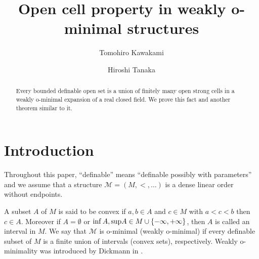 \documentclass{amsart}
\theoremstyle{definition}
\theoremstyle{plain}
\def \sup {{\rm sup}}
\begin{document}
\title[Open cell property in weakly o-minimal structures]{Open cell property in weakly o-minimal structures}
\author[T. Kawakami]{Tomohiro Kawakami}
\address{Department of Mathematics,
	Wakayama University,
	Wakayama, 640-8510, Japan}

\author[H. Tanaka]{Hiroshi Tanaka}
\address{Faculty of Engineering, Kindai University,
Hiroshima, 739-2116, Japan}


\begin{abstract}
	Every bounded definable open set is a union of finitely many
	open strong cells in a weakly o-minimal expansion of a real
	closed field. We prove this fact and another theorem similar
	to it.	
\end{abstract}



\maketitle




\section{Introduction}

Throughout this paper, 
``definable'' means ``definable possibly with parameters''
and 
we assume that 
a structure $\mathcal M = (M, <, \dots)$ is 
a dense linear order without endpoints. 

A subset $A$ of $M$ is said to be convex
if $a, b \in A$ and $c \in M$ with $a < c < b$ then $c \in A$.
Moreover if 
$A = \emptyset$ or $\inf A, \sup A \in M \cup \{-\infty, +\infty\}$,
then $A$ is called an interval in $M$.
We say that $\mathcal M$ is o-minimal (weakly o-minimal)
if every definable subset of $M$ is 
a finite union of intervals (convex sets), respectively. 
Weakly o-minimality was introduced by Dickmann in \cite{Di}.
\end{document}
